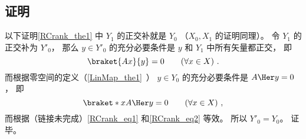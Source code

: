 \subsection{证明}
以下证明\autoref{RCrank_the1} 中 $Y_1$ 的正交补就是 $Y_0$ （$X_0, X_1$ 的证明同理）。 令 $Y_1$ 的正交补为 $Y'_0$， 那么 $y \in Y'_0$ 的充分必要条件是 $y$ 和 $Y_1$ 中所有矢量都正交， 即
\begin{equation}\label{RCrank_eq1}
\braket{Ax}{y} = 0 \qquad (\forall x \in X)~.
\end{equation}
而根据零空间的定义（\autoref{LinMap_the1}~） $y \in Y_0$ 的充分必要条件是 $A\Her y = 0$， 即
\begin{equation}\label{RCrank_eq2}
\braket*{x}{A\Her y} = 0 \qquad (\forall x \in X)~,
\end{equation}
而根据（链接未完成）\autoref{RCrank_eq1} 和\autoref{RCrank_eq2} 等效。 所以 $Y'_0 = Y_0$。 证毕。
